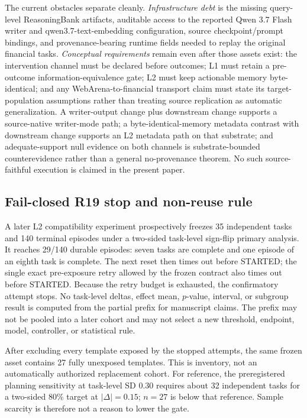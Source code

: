 The current obstacles separate cleanly. \emph{Infrastructure debt} is the missing query-level ReasoningBank artifacts, auditable access to the reported Qwen 3.7 Flash writer and qwen3.7-text-embedding configuration, source checkpoint/prompt bindings, and provenance-bearing runtime fields needed to replay the original financial tasks. \emph{Conceptual requirements} remain even after those assets exist: the intervention channel must be declared before outcomes; L1 must retain a pre-outcome information-equivalence gate; L2 must keep actionable memory byte-identical; and any WebArena-to-financial transport claim must state its target-population assumptions rather than treating source replication as automatic generalization. A writer-output change plus downstream change supports a source-native writer-mode path; a byte-identical-memory metadata contrast with downstream change supports an L2 metadata path on that substrate; and adequate-support null evidence on both channels is substrate-bounded counterevidence rather than a general no-provenance theorem. No such source-faithful execution is claimed in the present paper.

\subsection{Fail-closed R19 stop and non-reuse rule}
A later L2 compatibility experiment prospectively freezes 35 independent tasks and 140 terminal episodes under a two-sided task-level sign-flip primary analysis. It reaches 29/140 durable episodes: seven tasks are complete and one episode of an eighth task is complete. The next reset then times out before STARTED; the single exact pre-exposure retry allowed by the frozen contract also times out before STARTED. Because the retry budget is exhausted, the confirmatory attempt stops. No task-level deltas, effect mean, $p$-value, interval, or subgroup result is computed from the partial prefix for manuscript claims. The prefix may not be pooled into a later cohort and may not select a new threshold, endpoint, model, controller, or statistical rule.

After excluding every template exposed by the stopped attempts, the same frozen asset contains 27 fully unexposed templates. This is inventory, not an automatically authorized replacement cohort. For reference, the preregistered planning sensitivity at task-level SD $0.30$ requires about 32 independent tasks for a two-sided 80\% target at $|\Delta|=0.15$; $n=27$ is below that reference. Sample scarcity is therefore not a reason to lower the gate.

